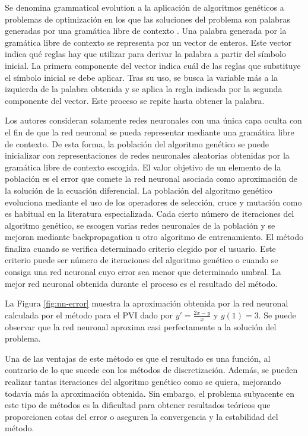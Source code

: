 \documentclass{article}
\theoremstyle{theorem-style}  %
\theoremstyle{definition-style}
\theoremstyle{example-style}
\begin{document}
	Se denomina grammatical evolution a la aplicación de algoritmos genéticos \cite{ga} a problemas de optimización en los que las soluciones del problema son palabras generadas por una gramática libre de contexto \cite{cfg}. Una palabra generada por la gramática libre de contexto se representa por un vector de enteros. Este vector indica qué reglas hay que utilizar para derivar la palabra a partir del símbolo inicial. La primera componente del vector indica cuál de las reglas que substituye el símbolo inicial se debe aplicar. Tras su uso, se busca la variable más a la izquierda de la palabra obtenida y se aplica la regla indicada por la segunda componente del vector. Este proceso se repite hasta obtener la palabra.
	
	Los autores consideran solamente redes neuronales con una única capa oculta con el fin de que la red neuronal se pueda representar mediante una gramática libre de contexto. De esta forma, la población del algoritmo genético se puede inicializar con representaciones de redes neuronales aleatorias obtenidas por la gramática libre de contexto escogida. El valor objetivo de un elemento de la población es el error que comete la red neuronal asociada como aproximación de la solución de la ecuación diferencial. La población del algoritmo genético evoluciona mediante el uso de los operadores de selección, cruce y mutación como es habitual en la literatura especializada. Cada cierto número de iteraciones del algoritmo genético, se escogen varias redes neuronales de la población y se mejoran mediante backpropagation u otro algoritmo de entrenamiento. El método finaliza cuando se verifica determinado criterio elegido por el usuario. Este criterio puede ser número de iteraciones del algoritmo genético o cuando se consiga una red neuronal cuyo error sea menor que determinado umbral. La mejor red neuronal obtenida durante el proceso es el resultado del método.
	
	La Figura \ref{fig:nn-error} muestra la aproximación obtenida por la red neuronal calculada por el método para el PVI dado por $y' = \frac{2x - y}{x}$ y $y(1) = 3$. Se puede observar que la red neuronal aproxima casi perfectamente a la solución del problema.
	
	Una de las ventajas de este método es que el resultado es una función, al contrario de lo que sucede con los métodos de discretización. Además, se pueden realizar tantas iteraciones del algoritmo genético como se quiera, mejorando todavía más la aproximación obtenida. Sin embargo, el problema subyacente en este tipo de métodos es la dificultad para obtener resultados teóricos que proporcionen cotas del error o aseguren la convergencia y la estabilidad del método.
	
\end{document}
